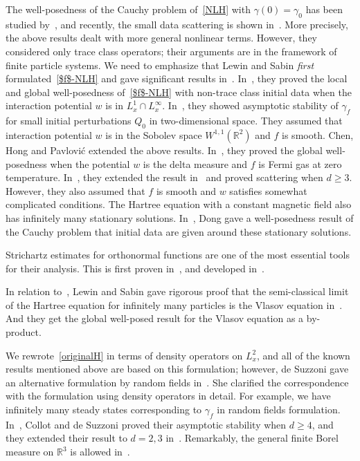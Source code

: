 \documentclass[AHL,Unicode,longabstracts,MathTools,published]{cedram}
\newcommand{\BR}{\mathbb{R}}
\newcommand{\ga}{\gamma}
\newcommand{\I}{\infty}
\newcommand{\R}{\mathbb{R}}
\begin{document}
The well-posedness of the Cauchy problem of~\eqref{NLH} with $\ga(0)=\ga_0$ has been studied by~\cite{1974BDF, 1976BDF, 1976C, 1992Z}, and recently, the small data scattering is shown in~\cite{2021PS}. More precisely, the above results dealt with more general nonlinear terms. However, they considered only trace class operators; their arguments are in the framework of finite particle systems. We need to emphasize that Lewin and Sabin \emph{first} formulated~\eqref{$f$-NLH} and gave significant results in~\cite{2014LS,2015LS}. In~\cite{2015LS}, they proved the local and global well-posedness of~\eqref{$f$-NLH} with non-trace class initial data when the interaction potential $w$ is in $L^1_x \cap L^\I_x$. In~\cite{2014LS}, they showed asymptotic stability of $\ga_f$ for small initial perturbations $Q_0$ in two-dimensional space. They assumed that interaction potential $w$ is in the Sobolev space $W^{1,1}(\BR^2)$ and $f$ is smooth. Chen, Hong and Pavlovi\'{c} extended the above results. In~\cite{2017CHP}, they proved the global well-posedness when the potential $w$ is the delta measure and $f$ is Fermi gas at zero temperature. In~\cite{2018CHP}, they extended the result in~\cite{2014LS} and proved scattering when $d \ge 3$. However, they also assumed that $f$ is smooth and $w$ satisfies somewhat complicated conditions. The Hartree equation with a constant magnetic field also has infinitely many stationary solutions. In~\cite{2021D}, Dong gave a well-posedness result of the Cauchy problem that initial data are given around these stationary solutions.

Strichartz estimates for orthonormal functions are one of the most essential tools for their analysis. This is first proven in~\cite{2014FLLS}, and developed in~\cite{2019BHLNS,2017FS}.

In relation to~\cite{2014LS,2015LS}, Lewin and Sabin gave rigorous proof that the semi-classical limit of the Hartree equation for infinitely many particles is the Vlasov equation in~\cite{2020LS}. And they get the global well-posed result for the Vlasov equation as a by-product.

We rewrote~\eqref{originalH} in terms of density operators on $L^2_x$, and all of the known results mentioned above are based on this formulation; however, de Suzzoni gave an alternative formulation by random fields in~\cite{2015S}. She clarified the correspondence with the formulation using density operators in detail. For example, we have infinitely many steady states corresponding to $\ga_f$ in random fields formulation. In~\cite{2020CS}, Collot and de Suzzoni proved their asymptotic stability when $d\geq 4$, and they extended their result to $d=2,3$ in~\cite{2022CS}. Remarkably, the general finite Borel measure on $\R^3$ is allowed in~\cite{2022CS}.
\end{document}
